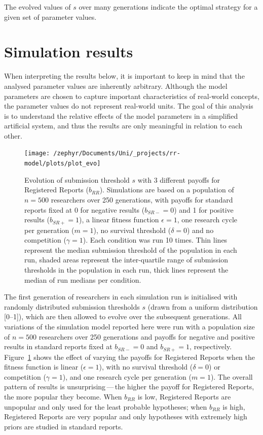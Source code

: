 \documentclass[british,,doc,mask,floatsintext]{apa6}
\begin{document}
The evolved values of \(s\) over many generations indicate the optimal strategy for a given set of parameter values.

\hypertarget{simulation-results}{%
\section{Simulation results}\label{simulation-results}}

When interpreting the results below, it is important to keep in mind that the analysed parameter values are inherently arbitrary.
Although the model parameters are chosen to capture important characteristics of real-world concepts, the parameter values do not represent real-world units.
The goal of this analysis is to understand the relative effects of the model parameters in a simplified artificial system, and thus the results are only meaningful in relation to each other.



\begin{figure}

{\centering \texttt{[image: /zephyr/Documents/Uni/\_projects/rr-model/plots/plot\_evo]} 

}

\caption{Evolution of submission threshold \(s\) with 3 different payoffs for Registered Reports (\(b_{RR}\)). Simulations are based on a population of \(n = 500\) researchers over 250 generations, with payoffs for standard reports fixed at 0 for negative results (\(b_{SR-} = 0\)) and 1 for positive results (\(b_{SR+} = 1\)), a linear fitness function \(\epsilon = 1\), one research cycle per generation (\(m = 1\)), no survival threshold (\(\delta = 0\)) and no competition (\(\gamma = 1\)). Each condition was run 10 times. Thin lines represent the median submission threshold of the population in each run, shaded areas represent the inter-quartile range of submission thresholds in the population in each run, thick lines represent the median of run medians per condition.}\label{fig:evoplot}
\end{figure}

The first generation of researchers in each simulation run is initialised with randomly distributed submission thresholds \(s\) (drawn from a uniform distribution {[}0--1{]}), which are then allowed to evolve over the subsequent generations.
All variations of the simulation model reported here were run with a population size of \(n = 500\) researchers over 250 generations and payoffs for negative and positive results in standard reports fixed at \(b_{SR-} = 0\) and \(b_{SR+} = 1\), respectively.
Figure~\ref{fig:evoplot} shows the effect of varying the payoffs for Registered Reports when the fitness function is linear (\(\epsilon = 1\)), with no survival threshold (\(\delta = 0\)) or competition (\(\gamma = 1\)), and one research cycle per generation (\(m = 1\)).
The overall pattern of results is unsurprising\(\,\)---\(\,\)the higher the payoff for Registered Reports, the more popular they become.
When \(b_{RR}\) is low, Registered Reports are unpopular and only used for the least probable hypotheses; when \(b_{RR}\) is high, Registered Reports are very popular and only hypotheses with extremely high priors are studied in standard reports.
\end{document}
